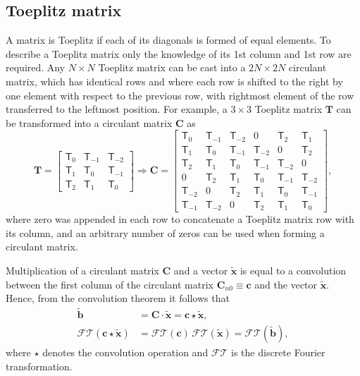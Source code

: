 \documentclass[
pra%
,preprint%
,amssymb, nobibnotes, aps, superscriptaddress, floatfix]{revtex4}
\begin{document}
\subsection{Toeplitz matrix}\label{sec:app_T}

A matrix is Toeplitz if each of its diagonals is formed of equal elements. To describe a Toeplitz matrix only the knowledge of its 1st column and 1st row are required. Any $N \times N $ Toeplitz matrix can be  cast into a $2N \times 2N$ circulant matrix, which has identical rows and where each row is shifted to the right by one element with respect to the previous row, with rightmost element of the row transferred to the leftmost position. For example, a $3 \times 3$ Toeplitz matrix $\mathbf{T}$ can be transformed into a circulant matrix $\mathbf{C}$ as
\begin{equation}
\mathbf{T} =
\begin{bmatrix}
\mathsf{T}_{0} & \mathsf{T}_{-1} & \mathsf{T}_{-2} \\
\mathsf{T}_{1} & \mathsf{T}_{0} & \mathsf{T}_{-1}  \\
\mathsf{T}_{2} & \mathsf{T}_{1} & \mathsf{T}_{0} 
\end{bmatrix}
\Rightarrow
\mathbf{C} =
\begin{bmatrix}
\mathsf{T}_{0} & \mathsf{T}_{-1} & \mathsf{T}_{-2}  & 0 &  \mathsf{T}_{2} & \mathsf{T}_{1} \\
\mathsf{T}_{1} & \mathsf{T}_{0} & \mathsf{T}_{-1}  &  \mathsf{T}_{-2} & 0 & \mathsf{T}_{2} \\
\mathsf{T}_{2} & \mathsf{T}_{1} & \mathsf{T}_{0}  &  \mathsf{T}_{-1} & \mathsf{T}_{-2} & 0 \\
0 & \mathsf{T}_{2} & \mathsf{T}_{1} & \mathsf{T}_{0}  &  \mathsf{T}_{-1} & \mathsf{T}_{-2} \\
\mathsf{T}_{-2} & 0 & \mathsf{T}_{2} & \mathsf{T}_{1} & \mathsf{T}_{0}  &  \mathsf{T}_{-1} \\
\mathsf{T}_{-1} & \mathsf{T}_{-2} &  0 & \mathsf{T}_{2} & \mathsf{T}_{1} & \mathsf{T}_{0}  
\end{bmatrix} \label{eq:toeplitz_example},
\end{equation}
where zero was appended in each row to concatenate a Toeplitz matrix row with its column, and an arbitrary number of zeros can be used when forming a circulant matrix.

Multiplication of a circulant matrix $\mathbf{C}$ and a vector $\mathbf{\tilde{x}}$ is equal to a convolution between the first column of the circulant matrix $\mathbf{C}_{n0} \equiv \mathbf{c}$ and the vector $\mathbf{\tilde{x}}$. Hence, from the convolution theorem it follows that
\begin{align}
\mathbf{\tilde{b}} & = \mathbf{C} \cdot \mathbf{\tilde{x}} = \mathbf{c} \star \mathbf{\tilde{x}} \nonumber,\\
\mathcal{FT}(\mathbf{c} \star \mathbf{\tilde{x}}) &= \mathcal{FT}(\mathbf{c}) \, \mathcal{FT}(\mathbf{\tilde{x}}) = \mathcal{FT}(\mathbf{\tilde{b}}),
\end{align}
where $\star$ denotes the convolution operation and $\mathcal{FT}$ is the discrete Fourier transformation. 
\end{document}
